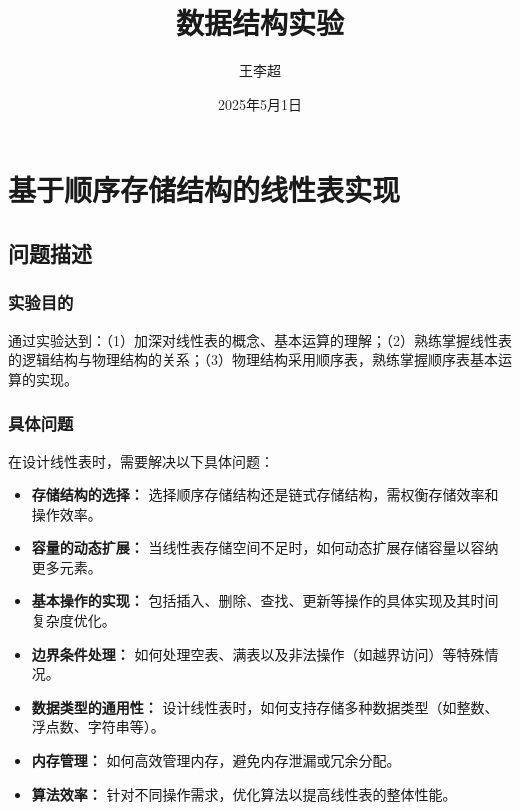 \documentclass[supercite]{Experimental_Report}
\title{~~~~~~数据结构实验~~~~~~}
\author{王李超}
\date{2025年5月1日}
\theoremstyle{definition}
\begin{document}
\maketitle

\clearpage


\tableofcontents[level=2]

\clearpage


\section{基于顺序存储结构的线性表实现}



\subsection{问题描述}

\subsubsection{实验目的}
通过实验达到：（1）加深对线性表的概念、基本运算的理解；（2）熟练掌握线性表的逻辑结构与物理结构的关系；（3）物理结构采用顺序表，熟练掌握顺序表基本运算的实现。

\subsubsection{具体问题}

在设计线性表时，需要解决以下具体问题：
\begin{itemize}
	\item \textbf{存储结构的选择：} 选择顺序存储结构还是链式存储结构，需权衡存储效率和操作效率。
	\item \textbf{容量的动态扩展：} 当线性表存储空间不足时，如何动态扩展存储容量以容纳更多元素。
	\item \textbf{基本操作的实现：} 包括插入、删除、查找、更新等操作的具体实现及其时间复杂度优化。
	\item \textbf{边界条件处理：} 如何处理空表、满表以及非法操作（如越界访问）等特殊情况。
	\item \textbf{数据类型的通用性：} 设计线性表时，如何支持存储多种数据类型（如整数、浮点数、字符串等）。
	\item \textbf{内存管理：} 如何高效管理内存，避免内存泄漏或冗余分配。
	\item \textbf{算法效率：} 针对不同操作需求，优化算法以提高线性表的整体性能。
\end{itemize}
\end{document}
